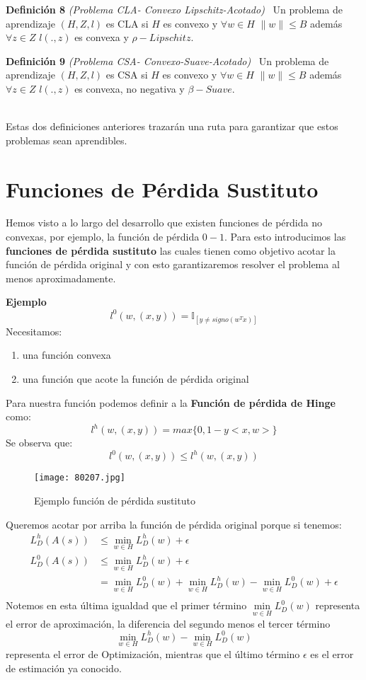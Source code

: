 \documentclass{article}
\providecommand{\norm}[1]{\lVert#1\rVert}
\begin{document}
\textbf{Definición 8} \textit{ (Problema CLA- Convexo Lipschitz-Acotado)}
\ Un problema de aprendizaje $(H,Z,l)$ es CLA si $H$ es convexo y $\forall w \in H$ $\norm{w}\leq B$ además $\forall z\in Z$ $l(.,z)$ es convexa y $\rho-Lipschitz$.

\textbf{Definición 9} \textit{ (Problema CSA- Convexo-Suave-Acotado)}
\ Un problema de aprendizaje $(H,Z,l)$ es CSA si $H$ es convexo y $\forall w \in H$ $\norm{w}\leq B$ además $\forall z\in Z$ $l(.,z)$ es convexa, no negativa y $\beta-Suave$.

\\Estas dos definiciones anteriores trazarán una ruta para garantizar que estos problemas sean aprendibles.

\section{Funciones de Pérdida Sustituto}
Hemos visto a lo largo del desarrollo que existen funciones de pérdida no convexas, por ejemplo, la función de pérdida $0-1$. Para esto introducimos las \textbf{funciones de pérdida sustituto} las cuales tienen como objetivo acotar la función de pérdida original y con esto garantizaremos resolver el problema al menos aproximadamente.

\textbf{Ejemplo}
$$l^{0}(w,(x,y))=\mathbb{I}_{[y\neq signo(w^{T}x)]}$$
Necesitamos:
\begin{enumerate}
    \item una función convexa
    \item una función que acote la función de pérdida original
\end{enumerate}
Para nuestra función podemos definir a la \textbf{Función de pérdida de Hinge} como:
$$l^{h}(w,(x,y))=max\{0,1-y<x,w>\}$$
Se observa que:
$$l^{0}(w,(x,y))\leq l^{h}(w,(x,y))$$
\newpage
\begin{figure}[h]
\caption{Ejemplo función de pérdida sustituto }
\centering
\texttt{[image: 80207.jpg]}
\end{figure}
Queremos acotar por arriba la función de pérdida original porque si tenemos:
\begin{align*}
     L^{h}_{D}(A(s))&\leq \min\limits_{w \in H} L^{h}_{D}(w) + \epsilon\\
     L^{0}_{D}(A(s))&\leq \min\limits_{w \in H} L^{h}_{D}(w) + \epsilon\\
     &= \min\limits_{w \in H} L^{0}_{D}(w)+\min\limits_{w \in H} L^{h}_{D}(w)-\min\limits_{w \in H} L^{0}_{D}(w)+\epsilon \\
\end{align*}
Notemos en esta última igualdad que el primer término $\min\limits_{w \in H} L^{0}_{D}(w)$ representa el error de aproximación, la diferencia del segundo menos el tercer término $$\min\limits_{w \in H} L^{h}_{D}(w)-\min\limits_{w \in H} L^{0}_{D}(w)$$ representa el error de Optimización, mientras que el último término $\epsilon$ es el error de estimación ya conocido.\\
\end{document}
